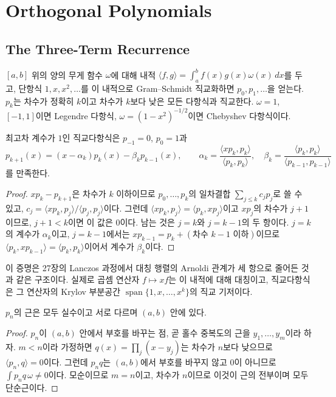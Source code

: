 \section{Orthogonal Polynomials}
\label{sec:orthogonal-polynomials}

\subsection{The Three-Term Recurrence}

$[a,b]$ 위의 양의 무게 함수 $\omega$에 대해 내적 $\langle f,g\rangle=\int_a^bf(x)g(x)\omega(x)\,dx$를 두고, 단항식 $1,x,x^2,\dots$를 이 내적으로 Gram--Schmidt 직교화하면  $p_0,p_1,\dots$을 얻는다. $p_k$는 차수가 정확히 $k$이고 차수가 $k$보다 낮은 모든 다항식과 직교한다. $\omega=1$, $[-1,1]$이면 Legendre 다항식, $\omega=(1-x^2)^{-1/2}$이면 Chebyshev 다항식이다.

\begin{theorem}
\label{thm:three-term}
최고차 계수가 $1$인 직교다항식은 $p_{-1}=0$, $p_0=1$과
\[
p_{k+1}(x)=(x-\alpha_k)p_k(x)-\beta_kp_{k-1}(x),\qquad\alpha_k=\frac{\langle xp_k,p_k\rangle}{\langle p_k,p_k\rangle},\quad\beta_k=\frac{\langle p_k,p_k\rangle}{\langle p_{k-1},p_{k-1}\rangle}
\]
를 만족한다.
\end{theorem}

\begin{proof}
$xp_k-p_{k+1}$은 차수가 $k$ 이하이므로 $p_0,\dots,p_k$의 일차결합 $\sum_{j\le k}c_jp_j$로 쓸 수 있고, $c_j=\langle xp_k,p_j\rangle/\langle p_j,p_j\rangle$이다. 그런데 $\langle xp_k,p_j\rangle=\langle p_k,xp_j\rangle$이고 $xp_j$의 차수가 $j+1$이므로, $j+1<k$이면 이 값은 $0$이다. 남는 것은 $j=k$와 $j=k-1$의 두 항이다. $j=k$의 계수가 $\alpha_k$이고, $j=k-1$에서는 $xp_{k-1}=p_k+(\text{차수 }k-1\text{ 이하})$이므로 $\langle p_k,xp_{k-1}\rangle=\langle p_k,p_k\rangle$이어서 계수가 $\beta_k$이다.
\end{proof}

이 증명은 27장의 Lanczos 과정에서 대칭 행렬의 Arnoldi 관계가 세 항으로 줄어든 것과 같은 구조이다. 실제로 곱셈 연산자 $f\mapsto xf$는 이 내적에 대해 대칭이고, 직교다항식은 그 연산자의 Krylov 부분공간 $\operatorname{span}\{1,x,\dots,x^k\}$의 직교 기저이다.

\begin{proposition}
\label{prop:orthopoly-roots}
$p_n$의 근은 모두 실수이고 서로 다르며 $(a,b)$ 안에 있다.
\end{proposition}

\begin{proof}
$p_n$이 $(a,b)$ 안에서 부호를 바꾸는 점, 곧 홀수 중복도의 근을 $y_1,\dots,y_m$이라 하자. $m<n$이라 가정하면 $q(x)=\prod_j(x-y_j)$는 차수가 $n$보다 낮으므로 $\langle p_n,q\rangle=0$이다. 그런데 $p_nq$는 $(a,b)$에서 부호를 바꾸지 않고 $0$이 아니므로 $\int p_nq\,\omega\ne0$이다. 모순이므로 $m=n$이고, 차수가 $n$이므로 이것이 근의 전부이며 모두 단순근이다.
\end{proof}

